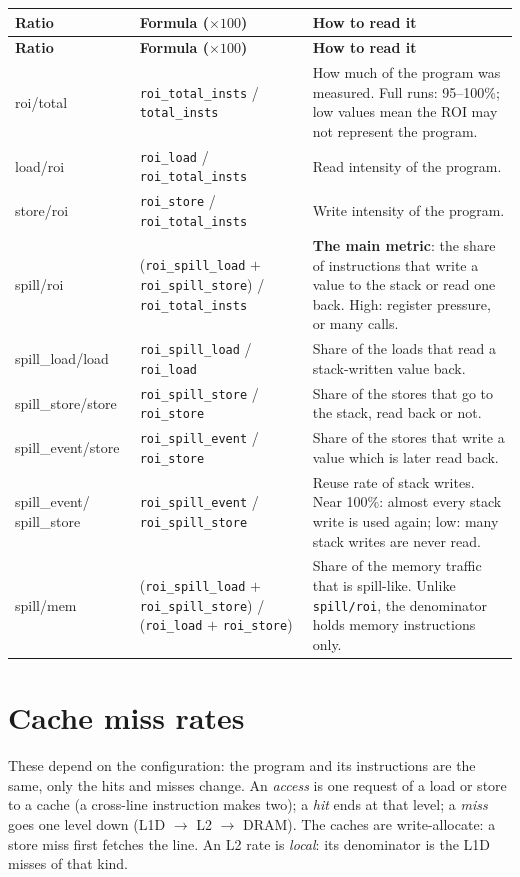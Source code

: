 \documentclass[10pt,a4paper]{article}
\newcommand{\ct}[1]{\texttt{#1}}
\begin{document}
{\small
\begin{xltabular}{\textwidth}{@{}C{36mm} L{0.95} L{1.05}@{}}
\toprule
\normalfont\textbf{Ratio} & \textbf{Formula ($\times 100$)} & \textbf{How to read it} \\
\midrule
\endfirsthead
\toprule
\normalfont\textbf{Ratio} & \textbf{Formula ($\times 100$)} & \textbf{How to read it} \\
\midrule
\endhead
\bottomrule
\endlastfoot
roi/total & \ct{roi\_total\_insts} / \ct{total\_insts}
  & How much of the program was measured. Full runs: 95--100\%; low values
    mean the ROI may not represent the program. \\
load/roi & \ct{roi\_load} / \ct{roi\_total\_insts}
  & Read intensity of the program. \\
store/roi & \ct{roi\_store} / \ct{roi\_total\_insts}
  & Write intensity of the program. \\
spill/roi & (\ct{roi\_spill\_load} $+$ \ct{roi\_spill\_store}) /
  \ct{roi\_total\_insts}
  & \textbf{The main metric}: the share of instructions that write a value
    to the stack or read one back. High: register pressure, or many calls. \\
spill\_load/load & \ct{roi\_spill\_load} / \ct{roi\_load}
  & Share of the loads that read a stack-written value back. \\
spill\_store/store & \ct{roi\_spill\_store} / \ct{roi\_store}
  & Share of the stores that go to the stack, read back or not. \\
spill\_event/store & \ct{roi\_spill\_event} / \ct{roi\_store}
  & Share of the stores that write a value which is later read back. \\
spill\_event/ spill\_store & \ct{roi\_spill\_event} / \ct{roi\_spill\_store}
  & Reuse rate of stack writes. Near 100\%: almost every stack write is used
    again; low: many stack writes are never read. \\
spill/mem & (\ct{roi\_spill\_load} $+$ \ct{roi\_spill\_store}) /
  (\ct{roi\_load} $+$ \ct{roi\_store})
  & Share of the memory traffic that is spill-like. Unlike
    \ct{spill/roi}, the denominator holds memory instructions only. \\
\end{xltabular}
}

\section{Cache miss rates}

These depend on the configuration: the program and its instructions are the
same, only the hits and misses change. An \emph{access} is one request of a
load or store to a cache (a cross-line instruction makes two); a \emph{hit}
ends at that level; a \emph{miss} goes one level down (L1D $\to$ L2 $\to$
DRAM). The caches are write-allocate: a store miss first fetches the line.
An L2 rate is \emph{local}: its denominator is the L1D misses of that kind.
\end{document}
